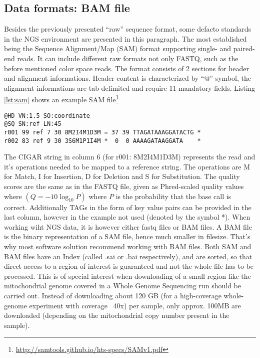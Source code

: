 \subsection{Data formats: BAM file}
Besides the previously presented "`raw"' sequence format, some defacto standards in the NGS environment are presented in this paragraph. The most established being the Sequence Alignment/Map (SAM) format\cite{Li2009} supporting single- and paired-end reads. It can include different raw formats not only FASTQ, such as the before mentioned color space reads. The format consists of 2 sections for header and alignment informations. Header content is characterized by "`@"' symbol, the alignment informations are tab delimited and require 11 mandatory fields. Listing \ref{lst:sam} shows an example SAM file\footnote{\url{http://samtools.github.io/hts-specs/SAMv1.pdf}} 
\begin{lstlisting}[caption= {Excerpt of a SAM file, representing two reads}, label={lst:sam}]
@HD VN:1.5 SO:coordinate
@SQ SN:ref LN:45
r001 99 ref 7 30 8M2I4M1D3M = 37 39 TTAGATAAAGGATACTG *
r002 83 ref 9 30 3S6M1P1I4M *  0  0 AAAAGATAAGGATA    *
\end{lstlisting}
The CIGAR string in column 6 (for r001: 8M2I4M1D3M) represents the read and it's operations needed to be mapped to a reference string. The operations are M for Match, I for Insertion, D for Deletion and S for Substitution. 
The quality scores are the same as in the FASTQ file, given as Phred-scaled quality values where $\left( Q=-10\log_{10} P\right)$ where $P$ is the probability that the base call is correct\cite{Loman2012}. Additionally TAGs in the form of key value pairs can be provided in the last column, however in the example not used (denoted by the symbol *).
When working wiht NGS data, it is however either fastq files or BAM files. A BAM file is the binary representation of a SAM file, hence much smaller in filesize. That's why most software solution recommend working with BAM files. Both SAM and BAM files have an Index (called .sai or .bai respectively), and are sorted, so that direct access to a region of interest is guaranteed and not the whole file has to be processed. This is of special interest when downloading of a small region like the mitochondrial genome covered in a Whole Genome Sequencing run should be carried out. Instead of downloading about 120 GB (for a high-coverage whole-genome experiment with coverage ~40x) per sample, only approx. 100MB are downloaded (depending on the mitochondrial copy number present in the sample).
